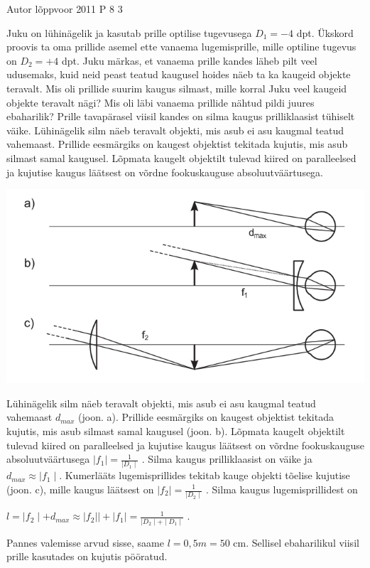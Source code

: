 {Autor} %
{lõppvoor} %
{2011} %
{P 8} %
{3} %
{
\ifStatement
Juku on lühinägelik ja kasutab prille optilise tugevusega $D_1 = -4$ dpt. Ükskord proovis ta oma prillide asemel ette vanaema lugemisprille, mille optiline tugevus on $D_2 = +4$ dpt. Juku märkas, et vanaema prille kandes läheb pilt veel udusemaks, kuid neid peast teatud kaugusel hoides näeb ta ka kaugeid objekte teravalt. Mis oli prillide suurim kaugus silmast, mille korral Juku veel kaugeid objekte teravalt nägi? Mis oli läbi vanaema prillide nähtud pildi juures ebaharilik? Prille tavapärasel viisil kandes on silma kaugus prilliklaasist tühiselt väike.
\fi
\ifHint
Lühinägelik silm näeb teravalt objekti, mis asub ei asu kaugmal teatud vahemaast. Prillide eesmärgiks on kaugest objektist tekitada kujutis, mis asub silmast samal kaugusel. Lõpmata kaugelt objektilt tulevad kiired on paralleelsed ja kujutise kaugus läätsest on võrdne fookuskauguse absoluutväärtusega.
\fi
\ifSolution
\begin{center}
	\includegraphics[width=0.5\linewidth]{2011-v3p-08-lah.PNG}
\end{center}
Lühinägelik silm näeb teravalt objekti, mis asub ei asu kaugmal teatud vahemaast $d_{max}$ (joon. a). Prillide eesmärgiks on kaugest objektist tekitada kujutis, mis asub silmast samal kaugusel (joon. b). Lõpmata kaugelt objektilt tulevad kiired on paralleelsed ja kujutise kaugus läätsest on võrdne fookuskauguse absoluutväärtusega $\mid f_1 \mid = \frac{1}{\mid D_1 \mid}$ . Silma kaugus prilliklaasist on väike ja $d_{max} \approx \mid f_1 \mid$. Kumerlääts lugemisprillides tekitab kauge objekti tõelise kujutise (joon. c), mille kaugus läätsest on $\mid f_2 \mid = \frac{1}{\mid D_2 \mid}$ . Silma kaugus lugemisprillidest on 
\begin{center}
$l = \mid f_2 \mid + d_{max} \approx \mid f_2| \mid + \mid f_1 \mid = \frac{1}{\mid D_2 \mid + \mid D_1 \mid}$ .
\end{center}
Pannes valemisse arvud sisse, saame $l = 0,5 m = 50$ cm. Sellisel ebaharilikul viisil prille kasutades on kujutis pööratud.
\fi
}

